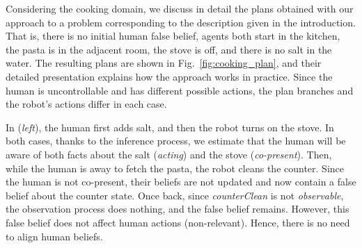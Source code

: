 Considering the cooking domain, we discuss in detail the plans obtained with our approach to a problem corresponding to the description given in the introduction. 
That is, there is no initial human false belief, agents both start in the kitchen, the pasta is in the adjacent room, the stove is off, and there is no salt in the water. The resulting plans are shown in Fig.~\ref{fig:cooking_plan}, and their detailed presentation explains how the approach works in practice. 
Since the human is uncontrollable and has different possible actions, the plan branches and the robot's actions differ in each case. 

In (\textit{left}), the human first adds salt, and then the robot turns on the stove. In both cases, thanks to the inference process, we estimate that the human will be aware of both facts about the salt (\textit{acting}) and the stove (\textit{co-present}). Then, while the human is away to fetch the pasta, the robot cleans the counter. Since the human is not co-present, their beliefs are not updated and now contain a false belief about the counter state. Once back, since \textit{counterClean} is not \textit{observable}, the observation process does nothing, and the false belief remains. However, this false belief does not affect human actions (non-relevant). Hence, there is no need to align human beliefs.

